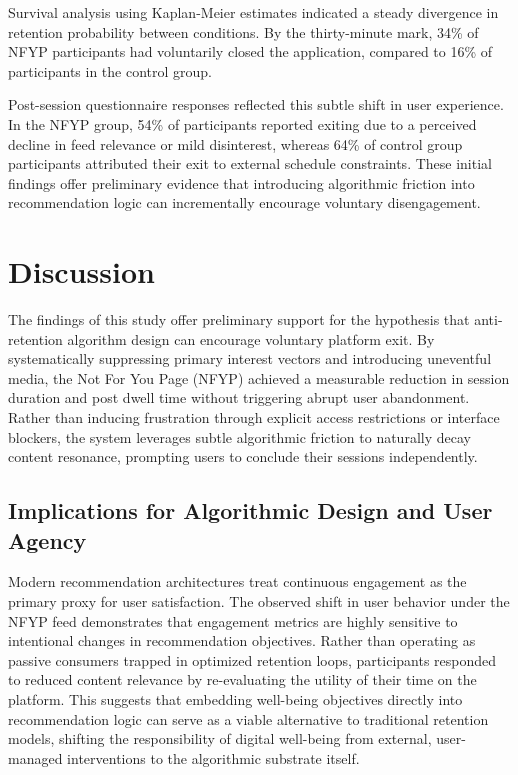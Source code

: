 \documentclass[10pt,leqno,twoside]{article}
\begin{document}
Survival analysis using Kaplan-Meier estimates indicated a steady divergence in retention probability between conditions. By the thirty-minute mark, 34\% of NFYP participants had voluntarily closed the application, compared to 16\% of participants in the control group. 

Post-session questionnaire responses reflected this subtle shift in user experience. In the NFYP group, 54\% of participants reported exiting due to a perceived decline in feed relevance or mild disinterest, whereas 64\% of control group participants attributed their exit to external schedule constraints. These initial findings offer preliminary evidence that introducing algorithmic friction into recommendation logic can incrementally encourage voluntary disengagement.



\section{Discussion}

The findings of this study offer preliminary support for the hypothesis that anti-retention algorithm design can encourage voluntary platform exit. By systematically suppressing primary interest vectors and introducing uneventful media, the Not For You Page (NFYP) achieved a measurable reduction in session duration and post dwell time without triggering abrupt user abandonment. Rather than inducing frustration through explicit access restrictions or interface blockers, the system leverages subtle algorithmic friction to naturally decay content resonance, prompting users to conclude their sessions independently.

\subsection{Implications for Algorithmic Design and User Agency}
Modern recommendation architectures treat continuous engagement as the primary proxy for user satisfaction. The observed shift in user behavior under the NFYP feed demonstrates that engagement metrics are highly sensitive to intentional changes in recommendation objectives. Rather than operating as passive consumers trapped in optimized retention loops, participants responded to reduced content relevance by re-evaluating the utility of their time on the platform. This suggests that embedding well-being objectives directly into recommendation logic can serve as a viable alternative to traditional retention models, shifting the responsibility of digital well-being from external, user-managed interventions to the algorithmic substrate itself.
\end{document}

